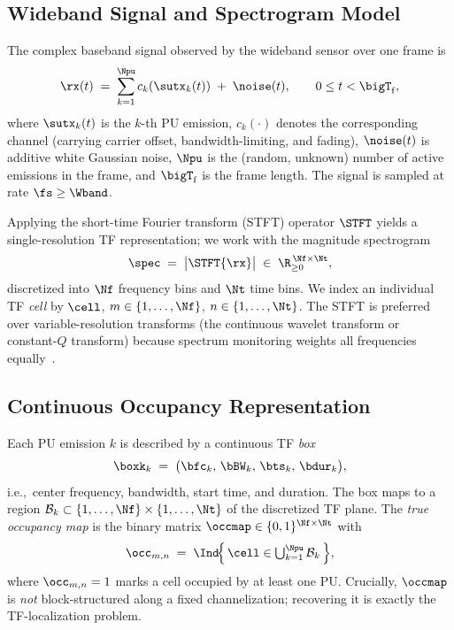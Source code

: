 \subsection{Wideband Signal and Spectrogram Model}
\label{subsec:signal}
The complex baseband signal observed by the wideband sensor over one frame
is
\begin{equation}
\rx(t) \;=\; \sum_{k=1}^{\Npu} c_k\!\left(\sutx_k(t)\right) \;+\; \noise(t),
\qquad 0 \le t < \bigT_{\mathrm{f}},
\label{eq:rx}
\end{equation}
where $\sutx_k(t)$ is the $k$-th PU emission, $c_k(\cdot)$ denotes the
corresponding channel (carrying carrier offset, bandwidth-limiting, and
fading), $\noise(t)$ is additive white Gaussian noise, $\Npu$ is the
(random, unknown) number of active emissions in the frame, and
$\bigT_{\mathrm{f}}$ is the frame length. The signal is sampled at rate
$\fs \ge \Wband$.

Applying the short-time Fourier transform (STFT) operator $\STFT$ yields a
single-resolution TF representation; we work with the
magnitude spectrogram
\begin{equation}
\spec \;=\; \bigl|\STFT\{\rx\}\bigr| \;\in\; \R_{\ge 0}^{\,\Nf \times \Nt},
\label{eq:stft}
\end{equation}
discretized into $\Nf$ frequency bins and $\Nt$ time bins. We index an
individual TF \emph{cell} by $\cell$, $m\in\{1,\dots,\Nf\}$,
$n\in\{1,\dots,\Nt\}$. The STFT is preferred over variable-resolution
transforms (the continuous wavelet transform or constant-$Q$ transform)
because spectrum monitoring weights all frequencies equally~\cite{prasad2020}.

\subsection{Continuous Occupancy Representation}
\label{subsec:occupancy}
Each PU emission $k$ is described by a continuous TF \emph{box}
\begin{equation}
\boxk_k \;=\; \bigl(\bfc_k,\, \bBW_k,\, \bts_k,\, \bdur_k\bigr),
\label{eq:box}
\end{equation}
i.e.,\ center frequency, bandwidth, start time, and duration. The box maps to
a region $\mathcal{B}_k \subset \{1,\dots,\Nf\}\times\{1,\dots,\Nt\}$ of the
discretized TF plane. The \emph{true occupancy map} is the binary matrix
$\occmap\in\{0,1\}^{\Nf\times\Nt}$ with
\begin{equation}
\occ_{m,n} \;=\;
\Ind\!\Bigl\{\, \cell \in \textstyle\bigcup_{k=1}^{\Npu}\mathcal{B}_k \,\Bigr\},
\label{eq:occupancy}
\end{equation}
where $\occ_{m,n}=1$ marks a cell occupied by at least one PU. Crucially,
$\occmap$ is \emph{not} block-structured along a fixed channelization;
recovering it is exactly the TF-localization problem.

